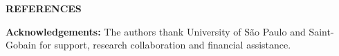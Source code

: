 \documentclass[10pt]{article}
\begin{document}
\vspace{24pt}

\begin{flushleft}
\textbf{REFERENCES}

\vspace{6pt}

\vspace{12pt}

\textbf{Acknowledgements:} The authors thank University of São Paulo and Saint-Gobain for support, research collaboration and financial assistance.
\end{flushleft}
\end{document}
